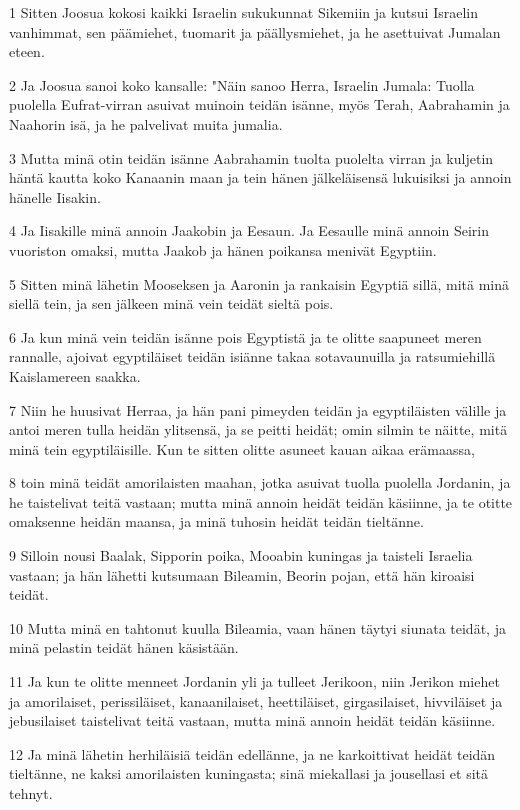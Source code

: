 \par 1 Sitten Joosua kokosi kaikki Israelin sukukunnat Sikemiin ja kutsui Israelin vanhimmat, sen päämiehet, tuomarit ja päällysmiehet, ja he asettuivat Jumalan eteen.
\par 2 Ja Joosua sanoi koko kansalle: "Näin sanoo Herra, Israelin Jumala: Tuolla puolella Eufrat-virran asuivat muinoin teidän isänne, myös Terah, Aabrahamin ja Naahorin isä, ja he palvelivat muita jumalia.
\par 3 Mutta minä otin teidän isänne Aabrahamin tuolta puolelta virran ja kuljetin häntä kautta koko Kanaanin maan ja tein hänen jälkeläisensä lukuisiksi ja annoin hänelle Iisakin.
\par 4 Ja Iisakille minä annoin Jaakobin ja Eesaun. Ja Eesaulle minä annoin Seirin vuoriston omaksi, mutta Jaakob ja hänen poikansa menivät Egyptiin.
\par 5 Sitten minä lähetin Mooseksen ja Aaronin ja rankaisin Egyptiä sillä, mitä minä siellä tein, ja sen jälkeen minä vein teidät sieltä pois.
\par 6 Ja kun minä vein teidän isänne pois Egyptistä ja te olitte saapuneet meren rannalle, ajoivat egyptiläiset teidän isiänne takaa sotavaunuilla ja ratsumiehillä Kaislamereen saakka.
\par 7 Niin he huusivat Herraa, ja hän pani pimeyden teidän ja egyptiläisten välille ja antoi meren tulla heidän ylitsensä, ja se peitti heidät; omin silmin te näitte, mitä minä tein egyptiläisille. Kun te sitten olitte asuneet kauan aikaa erämaassa,
\par 8 toin minä teidät amorilaisten maahan, jotka asuivat tuolla puolella Jordanin, ja he taistelivat teitä vastaan; mutta minä annoin heidät teidän käsiinne, ja te otitte omaksenne heidän maansa, ja minä tuhosin heidät teidän tieltänne.
\par 9 Silloin nousi Baalak, Sipporin poika, Mooabin kuningas ja taisteli Israelia vastaan; ja hän lähetti kutsumaan Bileamin, Beorin pojan, että hän kiroaisi teidät.
\par 10 Mutta minä en tahtonut kuulla Bileamia, vaan hänen täytyi siunata teidät, ja minä pelastin teidät hänen käsistään.
\par 11 Ja kun te olitte menneet Jordanin yli ja tulleet Jerikoon, niin Jerikon miehet ja amorilaiset, perissiläiset, kanaanilaiset, heettiläiset, girgasilaiset, hivviläiset ja jebusilaiset taistelivat teitä vastaan, mutta minä annoin heidät teidän käsiinne.
\par 12 Ja minä lähetin herhiläisiä teidän edellänne, ja ne karkoittivat heidät teidän tieltänne, ne kaksi amorilaisten kuningasta; sinä miekallasi ja jousellasi et sitä tehnyt.
